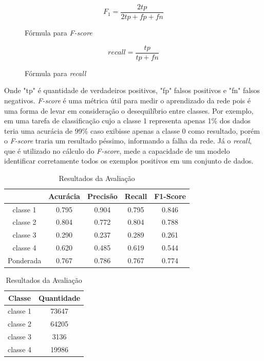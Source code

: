 \begin{figure}[ht]
    \[F_{1} = \frac{2tp}{2tp + fp + fn}\]
    \caption{Fórmula para \textit{F-score}}
\end{figure}

\begin{figure}[ht]
    \[ \textit{recall} =  \frac{tp}{tp + fn}\]
    \caption{Fórmula para \textit{recall}}
\end{figure}

Onde "tp" é quantidade de verdadeiros positivos, "fp" falsos positivos e "fn" falsos negativos. \textit{F-score} é uma métrica útil para medir o aprendizado da rede pois é uma forma de levar em consideração o desequilíbrio entre classes. Por exemplo, em uma tarefa de classificação cujo a classe 1 representa apenas 1\% dos dados teria uma acurácia de 99\% caso exibisse apenas a classe 0 como resultado, porém o \textit{F-score} traria um resultado péssimo, informando a falha da rede. Já o \textit{recall}, que é utilizado no cálculo do \textit{F-score}, mede a capacidade de um modelo identificar corretamente todos os exemplos positivos em um conjunto de dados. 


    
\begin{table}[h]
    \centering
    \begin{tabular}{|c|c|c|c|c|}
        \hline
        & Acurácia & Precisão & Recall & F1-Score \\
        \hline
        classe 1 & 0.795 & 0.904 & 0.795 & 0.846 \\
        classe 2 & 0.804 & 0.772 & 0.804 & 0.788 \\
        classe 3 & 0.290 & 0.237 & 0.289 & 0.261 \\
        classe 4 & 0.620 & 0.485 & 0.619 & 0.544 \\
        \hline
        Ponderada & 0.767 & 0.786 & 0.767 & 0.774 \\
        \hline
    \end{tabular}


    \vspace{10pt}
    
    \begin{tabular}{|c|c|}
        \hline
        Classe & Quantidade \\
        \hline
        classe 1 & 73647 \\
        classe 2 & 64205 \\
        classe 3 & 3136 \\
        classe 4 & 19986 \\
        \hline
    \end{tabular}
    \caption{Resultados da Avaliação}
    \label{tab:resultados}
\end{table}

